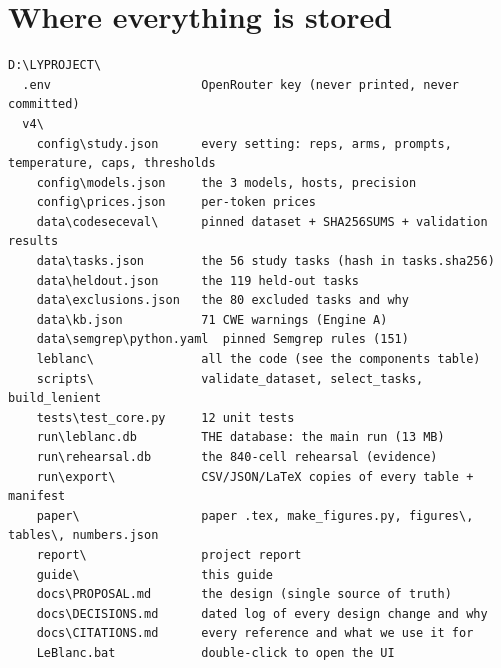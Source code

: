 \documentclass[11pt]{article}
\begin{document}
\section{Where everything is stored}
\begin{lstlisting}
D:\LYPROJECT\
  .env                     OpenRouter key (never printed, never committed)
  v4\
    config\study.json      every setting: reps, arms, prompts, temperature, caps, thresholds
    config\models.json     the 3 models, hosts, precision
    config\prices.json     per-token prices
    data\codeseceval\      pinned dataset + SHA256SUMS + validation results
    data\tasks.json        the 56 study tasks (hash in tasks.sha256)
    data\heldout.json      the 119 held-out tasks
    data\exclusions.json   the 80 excluded tasks and why
    data\kb.json           71 CWE warnings (Engine A)
    data\semgrep\python.yaml  pinned Semgrep rules (151)
    leblanc\               all the code (see the components table)
    scripts\               validate_dataset, select_tasks, build_lenient
    tests\test_core.py     12 unit tests
    run\leblanc.db         THE database: the main run (13 MB)
    run\rehearsal.db       the 840-cell rehearsal (evidence)
    run\export\            CSV/JSON/LaTeX copies of every table + manifest
    paper\                 paper .tex, make_figures.py, figures\, tables\, numbers.json
    report\                project report
    guide\                 this guide
    docs\PROPOSAL.md       the design (single source of truth)
    docs\DECISIONS.md      dated log of every design change and why
    docs\CITATIONS.md      every reference and what we use it for
    LeBlanc.bat            double-click to open the UI
\end{lstlisting}
\end{document}
